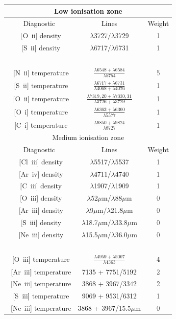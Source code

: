 \documentclass[useAMS,usenatbib]{mn2e}
\begin{document}
\begin{table}
\begin{tabular}{ccc}
\hline
\multicolumn{3}{c}{Low ionisation zone}\\
\hline
Diagnostic & Lines & Weight \\
~[O~{\sc ii}] density & $\lambda$3727/$\lambda$3729 & 1 \\
~[S~{\sc ii}] density & $\lambda$6717/$\lambda$6731 & 1 \\
~\\
~[N~{\sc ii}] temperature & $\frac{\lambda 6548 + \lambda 6584}{\lambda 5754}$ & 5 \\
~[S~{\sc ii}] temperature & $\frac{\lambda 6717 + \lambda 6731}{\lambda 4068 +  \lambda 4076}$ & 1 \\
~[O~{\sc ii}] temperature & $\frac{\lambda 7319,20 + \lambda 7330,31}{\lambda 3726 + \lambda 3729}$ & 1 \\
~[O~{\sc i}] temperature & $\frac{\lambda 6363 + \lambda 6300}{\lambda 5577}$ & 1 \\
~[C~{\sc i}] temperature & $\frac{\lambda 9850 + \lambda 9824}{\lambda 8727}$ & 1 \\
\hline
\multicolumn{3}{c}{Medium ionisation zone}\\
\hline
Diagnostic & Lines & Weight \\
~[Cl~{\sc iii}] density & $\lambda$5517/$\lambda$5537 & 1 \\
~[Ar~{\sc iv}] density & $\lambda$4711/$\lambda$4740 & 1 \\
~[C~{\sc iii}] density & $\lambda$1907/$\lambda$1909 & 1 \\
~[O~{\sc iii}] density & $\lambda$52$\mu$m/$\lambda$88$\mu$m & 0 \\
~[Ar~{\sc iii}] density & $\lambda$9$\mu$m/$\lambda$21.8$\mu$m & 0 \\
~[S~{\sc iii}] density & $\lambda$18.7$\mu$m/$\lambda$33.8$\mu$m & 0 \\
~[Ne~{\sc iii}] density & $\lambda$15.5$\mu$m/$\lambda$36.0$\mu$m & 0 \\
~\\
~[O~{\sc iii}] temperature & $\frac{\lambda 4959 + \lambda 5007}{\lambda 4363}$ & 4\\
~[Ar~{\sc iii}] temperature &7135 + 7751/5192 & 2\\
~[Ne~{\sc iii}] temperature & 3868 + 3967/3342 & 2\\
~[S~{\sc iii}] temperature & 9069 + 9531/6312 & 1\\
~[Ne~{\sc iii}] temperature & 3868 + 3967/15.5$\mu$m & 0\\

\end{tabular}
\end{table}
\end{document}
